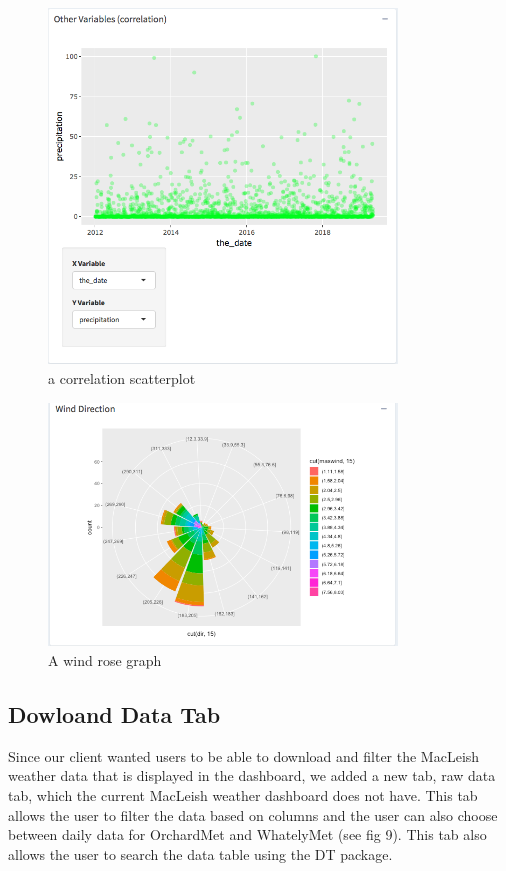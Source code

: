 \documentclass[10pt,letterpaper]{article}
\begin{document}
\begin{figure}
\includegraphics[width=350px]{correlation} \caption{a correlation scatterplot}\label{fig:unnamed-chunk-6}
\end{figure}

\begin{figure}
\includegraphics[width=350px]{WindRose} \caption{A wind rose graph}\label{fig:unnamed-chunk-7}
\end{figure}

\subsection{Dowloand Data Tab}\label{dowloand-data-tab}

Since our client wanted users to be able to download and filter the
MacLeish weather data that is displayed in the dashboard, we added a new
tab, raw data tab, which the current MacLeish weather dashboard does not
have. This tab allows the user to filter the data based on columns and
the user can also choose between daily data for OrchardMet and
WhatelyMet (see fig 9). This tab also allows the user to search the data
table using the DT package.
\end{document}
